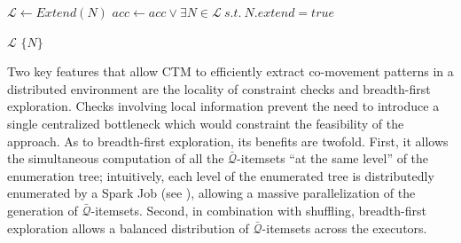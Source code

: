 \documentclass[preprint,12pt,authoryear]{elsarticle} %
\begin{document}
\begin{algorithm}[t]
\begin{algorithmic}[1]
        \State $\mathcal{L} \gets Extend(N)$                                       \label{alg:dist17}
        \State $acc \gets acc\vee\exists N \in \mathcal{L}~s.t.~N.extend = true$  \label{alg:dist18}
        \item[] 
        \State \Return $\mathcal{L}$                                               \label{alg:dist19}
        \Else {}                                                                     \label{alg:dist20}
        \State \Return $\{ N \}$                                                   \label{alg:dist21}
        \EndIf
    \EndFunction
\end{algorithmic}
\end{algorithm}

Two key features that allow CTM to efficiently extract co-movement patterns in a distributed environment are the locality of constraint checks and breadth-first exploration.
Checks involving local information prevent the need to introduce a single centralized bottleneck which would constraint the feasibility of the approach.
As to breadth-first exploration, its benefits are twofold.
First, it allows the simultaneous computation of all the $\bar{\mathcal{Q}}$-itemsets ``at the same level'' of the enumeration tree; intuitively, each level of the enumerated tree is distributedly enumerated by a Spark Job (see ), allowing a massive parallelization of the generation of $\bar{\mathcal{Q}}$-itemsets.
Second, in combination with shuffling, breadth-first exploration allows a balanced distribution of $\bar{\mathcal{Q}}$-itemsets across the executors.
\end{document}
